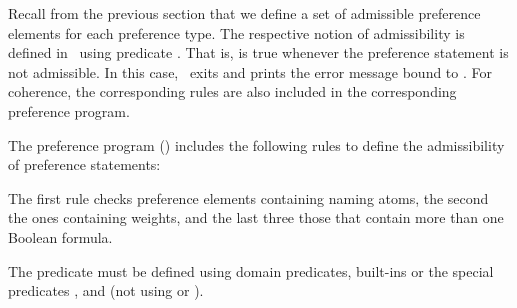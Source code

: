 Recall from the previous section that we define a set of admissible preference elements for each preference type.
The respective notion of admissibility is defined in \asprin\ using predicate .
That is,  is true whenever the preference statement is not admissible.
In this case, \asprin\ exits and prints the error message bound to .
For coherence, the corresponding rules are also included in the corresponding preference program.
\begin{example}
The preference program ()
includes the following rules to define the admissibility of  preference statements:
%

%
The first rule checks preference elements containing naming atoms, 
the second the ones containing weights, 
and the last three those that contain more than one Boolean formula.
\end{example}

\begin{note}
The predicate  must be defined using domain predicates, built-ins or the special 
predicates ,  and  
(not using  or ).
\end{note}


